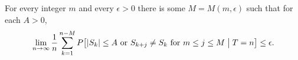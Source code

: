 For every integer $m$ and every $\epsilon > 0$ there is some $M = M(m,\epsilon)$ such that for each $A > 0$,
$$\lim_{n \to \infty} \frac{1}{n} \sum_{k=1}^{n-M} P\bigl[|S_k| \leq A \text{ or } S_{k+j} \neq S_k \text{ for } m \leq j \leq M \bigm| T = n\bigr] \leq \epsilon.$$
